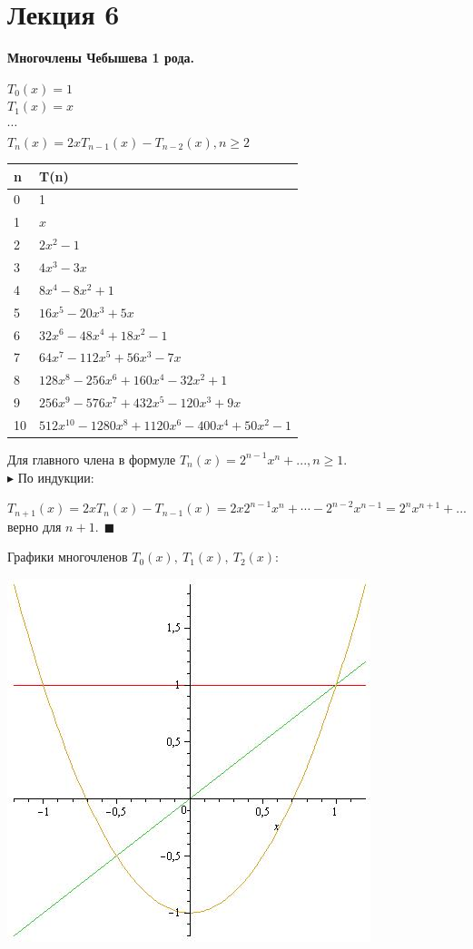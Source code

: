 \documentclass[12pt]{article}
\theoremstyle{definition}
\numberwithin{equation}{section}
\begin{document}
\section *{Лекция 6}
\noindent \textbf{Многочлены Чебышева 1 рода.}
\begin{center}
$T_0(x) = 1$ \\
$T_1(x) = x$\\
$\cdots$\\
$T_n(x) = 2xT_{n-1}(x)-T_{n-2}(x), n\geqslant 2$
\end{center} 
\begin{center}
\begin{tabular}{|l|l|}
\hline
\textbf{n} & \textbf{T(n)} \\ \hline
0 & 1 \\ \hline
1 & $x$ \\ \hline
2 & $2x^2-1$ \\ \hline
3 & $4x^3-3x$ \\ \hline
4 & $8x^4-8x^2+1$ \\ \hline
5 & $16x^5-20x^3+5x$ \\ \hline
6 & $32x^6-48x^4+18x^2-1$ \\ \hline
7 & $64x^7-112x^5+56x^3-7x$ \\ \hline
8 & $128x^8-256x^6+160x^4-32x^2+1$ \\ \hline
9 & $256x^9-576x^7+432x^5-120x^3+9x$ \\ \hline
10 & $512x^{10}-1280x^8+1120x^6-400x^4+50x^2-1$ \\ \hline
\end{tabular}
\end{center}
Для главного члена в формуле $T_n(x)=2^{n-1}x^n+..., n\geqslant 1$.\\
$\blacktriangleright$ По индукции:\begin{center}
$T_{n+1}(x)=2xT_n(x)-T_{n-1}(x)=2x2^{n-1}x^n+\cdots-2^{n-2}x^{n-1}=2^nx^{n+1}+...$ верно для $n+1. ~~\blacksquare$\end{center}
Графики многочленов $T_0(x),~ T_1(x),~ T_2(x)$:\begin{center}
\includegraphics[scale=0.5]{T0T1T2.jpg} \end{center}
\end{document}
